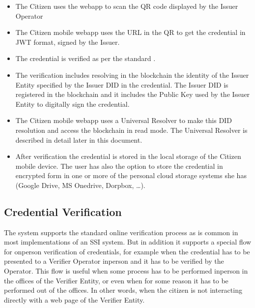 \documentclass[letterpaper,10pt,english]{sphinxmanual}
\begin{document}
\sphinxAtStartPar
{}
\begin{itemize}
\item {} 
\sphinxAtStartPar
The Citizen uses the webapp to scan the QR code displayed by the Issuer Operator

\item {} 
\sphinxAtStartPar
The Citizen mobile webapp uses the URL in the QR to get the credential in JWT format, signed by the Issuer.

\end{itemize}

\sphinxAtStartPar
{}
\begin{itemize}
\item {} 
\sphinxAtStartPar
The credential is verified as per the standard .

\item {} 
\sphinxAtStartPar
The verification includes resolving in the blockchain the identity of the Issuer Entity specified by the Issuer DID in the credential. The Issuer DID is registered in the blockchain and it includes the Public Key used by the Issuer Entity to digitally sign the credential.

\item {} 
\sphinxAtStartPar
The Citizen mobile webapp uses a Universal Resolver to make this DID resolution and access the blockchain in read mode. The Universal Resolver is described in detail later in this document.

\item {} 
\sphinxAtStartPar
After verification the credential is stored in the local storage of the Citizen mobile device. The user has also the option to store the credential in encrypted form in one or more of the personal cloud storage systems she has (Google Drive, MS Onedrive, Dorpbox, …).

\end{itemize}


\subsection{Credential Verification}
\label{\detokenize{privacycred:credential-verification}}
\sphinxAtStartPar
The system supports the standard online verification process as is common in most implementations of an SSI system. But in addition it supports a special flow for on\sphinxhyphen{}person verification of credentials, for example when the credential has to be presented to a Verifier Operator in\sphinxhyphen{}person and it has to be verified by the Operator.
This flow is useful when some process has to be performed in\sphinxhyphen{}person in the offices of the Verifier Entity, or even when for some reason it has to be performed out of the offices. In other words, when the citizen is not interacting directly with a web page of the Verifier Entity.
\end{document}
